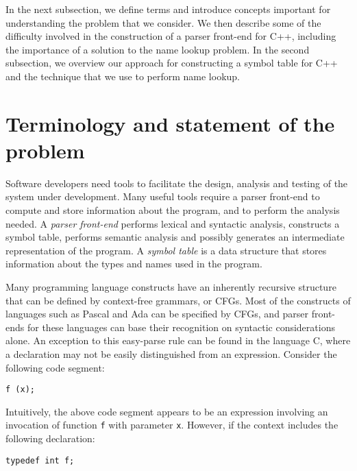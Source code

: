 In the next subsection, we define terms and introduce concepts
important for understanding the problem that we consider.
We then describe some of the difficulty involved in the
construction of
a parser front-end for C++, including the importance of
a solution to the name lookup problem.
In the second subsection, we overview our approach for
constructing a symbol table for C++ and the technique that we
use to perform name lookup.

\section{Terminology and statement of the problem}

Software developers need tools to facilitate
the design, analysis and testing of the system under development.
Many useful tools require a parser front-end to compute and
store information about the program, and to perform the analysis needed.
A {\em parser front-end} performs lexical and syntactic
analysis, constructs a symbol table, performs semantic
analysis and possibly generates an intermediate representation
of the program.
A {\em symbol table} is a data structure that stores information
about the types and names used in the program.

Many programming language constructs have an inherently recursive
structure that can be defined by context-free grammars, or CFGs\cite{aho86}.
Most of the constructs of languages such as Pascal and Ada
can be specified by CFGs, and parser front-ends for these languages
can base their recognition on syntactic considerations alone.
An exception to this easy-parse rule can be found in the language C,
where a declaration may not be easily distinguished from
an expression.  Consider the following code segment:

\begin{center}
\tt f (x);
\end{center}

\noindent
Intuitively, the above code segment appears to be an expression
involving an invocation of function {\tt f} with parameter {\tt x}.
However, if the context includes the following declaration: 

\begin{center}
\tt typedef int f;
\end{center}

